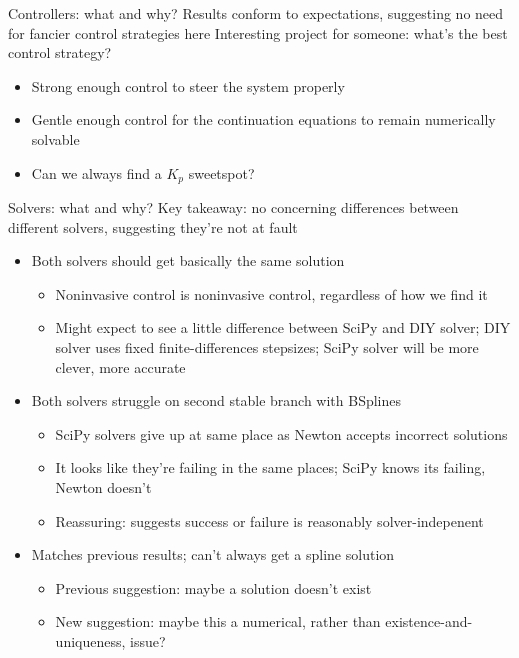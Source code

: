 \documentclass[presentation]{beamer}
\begin{document}
\begin{frame}[label={sec:org1916d2c}]{Controllers: what and why?}
Results conform to expectations, suggesting no need for fancier control strategies here
\vfill
Interesting project for someone: what's the best control strategy?
\begin{itemize}
\item Strong enough control to steer the system properly
\item Gentle enough control for the continuation equations to remain numerically solvable
\item Can we always find a \(K_p\) sweetspot?
\end{itemize}
\end{frame}

\begin{frame}[label={sec:orge949b7b},plain]{Solvers: what and why?}
\alert{Key takeaway: no concerning differences between different solvers, suggesting they're not at fault}
\vfill
\begin{itemize}
\item Both solvers should get basically the same solution
\begin{itemize}
\item Noninvasive control is noninvasive control, regardless of how we find it
\item Might expect to see a little difference between SciPy and DIY solver; DIY solver uses fixed finite-differences stepsizes; SciPy solver will be more clever, more accurate
\end{itemize}
\end{itemize}
\vfill
\begin{itemize}
\item Both solvers struggle on second stable branch with BSplines
\begin{itemize}
\item SciPy solvers give up at same place as Newton accepts incorrect solutions
\item It looks like they're failing in the same places; SciPy knows its failing, Newton doesn't
\item Reassuring: suggests success or failure is reasonably solver-indepenent
\end{itemize}
\end{itemize}
\vfill
\begin{itemize}
\item Matches previous results; can't always get a spline solution 
\begin{itemize}
\item Previous suggestion: maybe a solution doesn't exist
\item New suggestion: maybe this a numerical, rather than existence-and-uniqueness, issue?
\end{itemize}
\end{itemize}
\end{frame}
\end{document}
